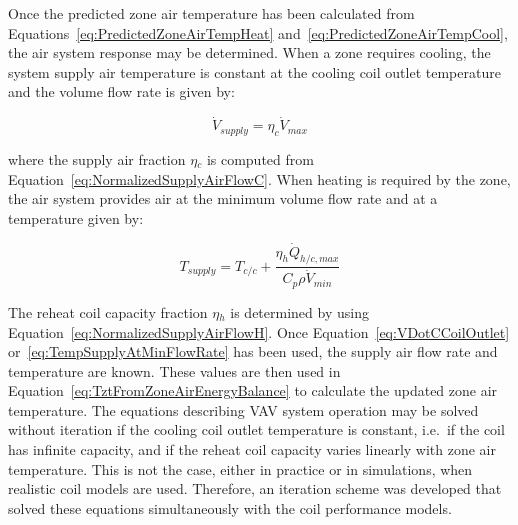 Once the predicted zone air temperature has been calculated from Equations~\ref{eq:PredictedZoneAirTempHeat} and~\ref{eq:PredictedZoneAirTempCool}, the air system response may be determined. When a zone requires cooling, the system supply air temperature is constant at the cooling coil outlet temperature and the volume flow rate is given by:

\begin{equation}
{\dot V_{supply}} = {\eta_c}{\dot V_{max}}
\label{eq:VDotCCoilOutlet}
\end{equation}

where the supply air fraction $\eta$\(_{c}\) is computed from Equation~\ref{eq:NormalizedSupplyAirFlowC}. When heating is required by the zone, the air system provides air at the minimum volume flow rate and at a temperature given by:

\begin{equation}
{T_{supply}} = {T_{c/c}} + \frac{{{\eta_h}{{\dot Q}_{h/c,max}}}}{{{C_p}\rho {{\dot V}_{min}}}}
\label{eq:TempSupplyAtMinFlowRate}
\end{equation}

The reheat coil capacity fraction $\eta$\(_{h}\) is determined by using Equation~\ref{eq:NormalizedSupplyAirFlowH}. Once Equation~\ref{eq:VDotCCoilOutlet} or~\ref{eq:TempSupplyAtMinFlowRate} has been used, the supply air flow rate and temperature are known. These values are then used in Equation~\ref{eq:TztFromZoneAirEnergyBalance} to calculate the updated zone air temperature. The equations describing VAV system operation may be solved without iteration if the cooling coil outlet temperature is constant, i.e.~if the coil has infinite capacity, and if the reheat coil capacity varies linearly with zone air temperature. This is not the case, either in practice or in simulations, when realistic coil models are used. Therefore, an iteration scheme was developed that solved these equations simultaneously with the coil performance models.

